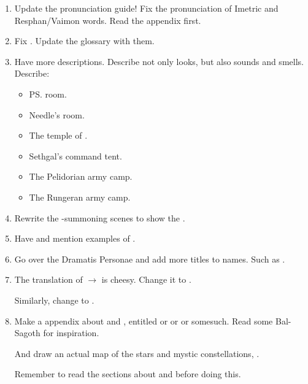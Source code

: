 \begin{enumerate}
  \item 
    Update the pronunciation guide!
    Fix the pronunciation of Imetric and Resphan/Vaimon words. 
    Read the  appendix first. 
    
  \item 
    Fix . 
    Update the glossary with them. 

  \item 
    Have more descriptions. 
    Describe not only looks, but also sounds and smells. 
    Describe: 
    \begin{itemize}
      \item \ps{\Tiroco} room. 
      \item Needle's room. 
      \item The temple of \EreshKal. 
      \item Sethgal's command tent. 
      \item The Pelidorian army camp. 
      \item The Rungeran army camp. 
    \end{itemize}
  
  \item 
    Rewrite the \Archon-summoning scenes to show the . 
  
  \item 
    Have and mention examples of . 
  
  \item 
    Go over the Dramatis Personae and add more titles to names. 
    Such as . 
  
  \item 
    The translation of  $\to$  is cheesy. 
    Change it to . 
    
    Similarly, change \itzach to .
  
  \item 
    Make a appendix about \matrices{} and , entitled  or  or  or somesuch. 
    Read some Bal-Sagoth for inspiration. 
    
    And draw an actual map of the stars and mystic constellations, . 
    
    Remember to read the sections about  and  before doing this. 
    

\end{enumerate}
